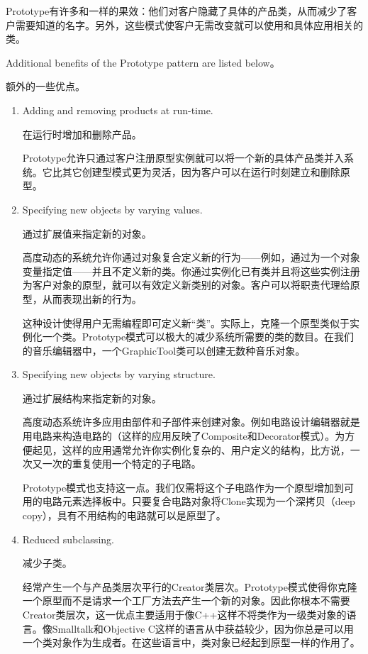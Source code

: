 Prototype有许多和一样的果效：他们对客户隐藏了具体的产品类，从而减少了客户需要知道的名字。另外，这些模式使客户无需改变就可以使用和具体应用相关的类。

Additional benefits of the Prototype pattern are listed below。

额外的一些优点。

\begin{enumerate}

\item Adding and removing products at run-time.

	  在运行时增加和删除产品。
	  
	  Prototype允许只通过客户注册原型实例就可以将一个新的具体产品类并入系统。它比其它创建型模式更为灵活，因为客户可以在运行时刻建立和删除原型。

\item Specifying new objects by varying values.

      通过扩展值来指定新的对象。

	  高度动态的系统允许你通过对象复合定义新的行为——例如，通过为一个对象变量指定值——并且不定义新的类。你通过实例化已有类并且将这些实例注册为客户对象的原型，就可以有效定义新类别的对象。客户可以将职责代理给原型，从而表现出新的行为。

	  这种设计使得用户无需编程即可定义新“类”。实际上，克隆一个原型类似于实例化一个类。Prototype模式可以极大的减少系统所需要的类的数目。在我们的音乐编辑器中，一个GraphicTool类可以创建无数种音乐对象。

\item Specifying new objects by varying structure.

	  通过扩展结构来指定新的对象。

	  高度动态系统许多应用由部件和子部件来创建对象。例如电路设计编辑器就是用电路来构造电路的（这样的应用反映了Composite和Decorator模式）。为方便起见，这样的应用通常允许你实例化复杂的、用户定义的结构，比方说，一次又一次的重复使用一个特定的子电路。

	  Prototype模式也支持这一点。我们仅需将这个子电路作为一个原型增加到可用的电路元素选择板中。只要复合电路对象将Clone实现为一个深拷贝（deep copy），具有不用结构的电路就可以是原型了。

\item Reduced subclassing. 

      减少子类。

	  经常产生一个与产品类层次平行的Creator类层次。Prototype模式使得你克隆一个原型而不是请求一个工厂方法去产生一个新的对象。因此你根本不需要Creator类层次，这一优点主要适用于像C++这样不将类作为一级类对象的语言。像Smalltalk和Objective C这样的语言从中获益较少，因为你总是可以用一个类对象作为生成者。在这些语言中，类对象已经起到原型一样的作用了。


\end{enumerate}
